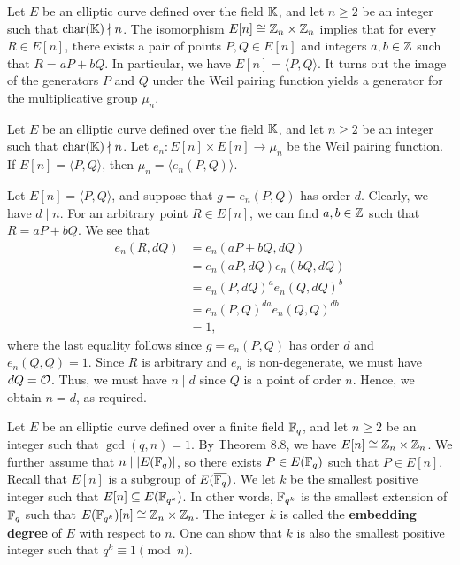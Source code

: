 Let $E$ be an elliptic curve defined over the field $\mathbb{K}$, and let $n \geq 2$ 
be an integer such that $\operatorname{char}(\mathbb{K}) \nmid n$. The isomorphism $E[n] 
\cong \mathbb{Z}_n \times \mathbb{Z}_n$ implies that for every $R \in E[n]$, there exists a 
pair of points $P, Q \in E[n]$ and integers $a, b \in \mathbb{Z}$ such that $R = aP + bQ$. In particular, we have 
$E[n] = \langle P, Q \rangle$. It turns out the image of the generators 
$P$ and $Q$ under the Weil pairing function yields a generator for the 
multiplicative group $\mu_n$. 

\begin{thm}
    Let $E$ be an elliptic curve defined over the field $\mathbb{K}$, and let 
    $n \geq 2$ be an integer such that $\operatorname{char}(\mathbb{K}) \nmid n$. Let 
    $e_n : E[n] \times E[n] \to \mu_n$ be the Weil pairing function. 
    If $E[n] = \langle P, Q \rangle$, then $\mu_n = \langle e_n(P, Q) \rangle$. 
\end{thm}
\begin{pf}
    Let $E[n] = \langle P, Q \rangle$, and suppose that $g = e_n(P, Q)$ 
    has order $d$. Clearly, we have $d \mid n$. For an arbitrary point 
    $R \in E[n]$, we can find $a, b \in \mathbb{Z}$ such that $R = aP + bQ$. 
    We see that 
    \begin{align*}
        e_n(R, dQ) &= e_n(aP + bQ, dQ) \\ 
        &= e_n(aP, dQ) e_n(bQ, dQ) \\ 
        &= e_n(P, dQ)^a e_n(Q, dQ)^b \\ 
        &= e_n(P, Q)^{da} e_n(Q, Q)^{db} \\ 
        &= 1,
    \end{align*}
    where the last equality follows since $g = e_n(P, Q)$ has order $d$ 
    and $e_n(Q, Q) = 1$. Since $R$ is arbitrary and $e_n$ is non-degenerate, 
    we must have $dQ = {\cal O}$. Thus, we must have $n \mid d$ since 
    $Q$ is a point of order $n$. Hence, we obtain $n = d$, as required. 
\end{pf}

Let $E$ be an elliptic curve defined over a finite field $\mathbb{F}_q$, and let 
$n \geq 2$ be an integer such that $\gcd(q, n) = 1$. By Theorem 8.8, we have 
$E[n] \cong \mathbb{Z}_n \times \mathbb{Z}_n$. We further assume that $n \mid |E(\mathbb{F}_q)|$, so 
there exists $P \in E(\mathbb{F}_q)$ such that $P \in E[n]$. Recall that $E[n]$ is a 
subgroup of $E(\overline{\mathbb{F}_q})$. We let $k$ be the smallest positive 
integer such that $E[n] \subseteq E(\mathbb{F}_{q^k})$. In other words, $\mathbb{F}_{q^k}$ 
is the smallest extension of $\mathbb{F}_q$ such that $E(\mathbb{F}_{q^k})[n] \cong \mathbb{Z}_n 
\times \mathbb{Z}_n$. The integer $k$ is called the {\bf embedding degree} of $E$ 
with respect to $n$. One can show that $k$ is also the smallest positive integer 
such that $q^k \equiv 1 \pmod n$. 

